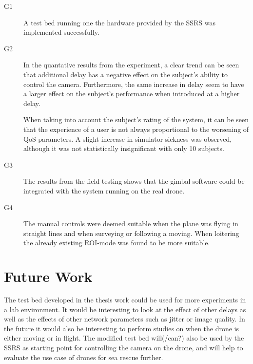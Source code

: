 \documentclass[nofilelist]{cslthse-msc}
\begin{document}
\begin{description}
   \item[G1]  A test bed running one the hardware provided by the SSRS was implemented successfully.

   \item[G2]  In the quantative results from the experiment, a clear trend can be seen that additional delay has a negative effect on the subject's ability to control the camera. Furthermore, the same increase in delay seem to have a larger effect on the subject's performance when introduced at a higher delay.  

   When taking into account the subject's rating of the system, it can be seen that the experience of a user is not always proportional to the worsening of QoS parameters. A slight increase in simulator sickness was observed, although it was not statistically insignificant with only 10 subjects.

   \item[G3] The results from the field testing shows that the gimbal software could be integrated with the system running on the real drone.

   \item[G4] The manual controls were deemed suitable when the plane was flying in straight lines and when surveying or following a moving. When loitering the already existing ROI-mode was found to be more suitable.
\end{description}

\chapter{Future Work}
The test bed developed in the thesis work could be used for more experiments in a lab environment. It would be interesting to look at the effect of other delays as well as the effects of other network parameters such as jitter or image quality. In the future it would also be interesting to perform studies on when the drone is either moving or in flight.
The modified test bed will(/can?) also be used by the SSRS as starting point for controlling the camera on the drone, and will help to evaluate the use case of drones for sea rescue further.

{}
\end{document}
